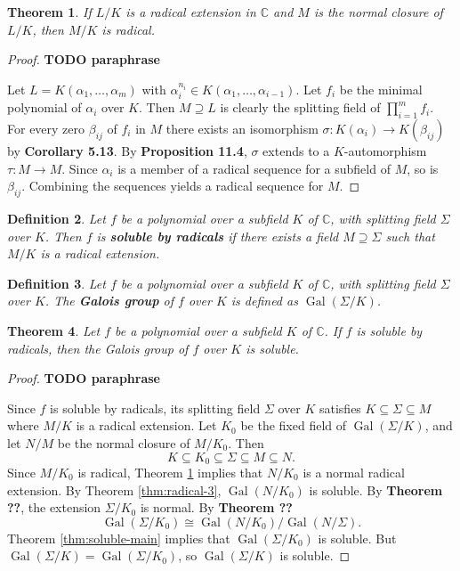 \documentclass[12pt]{article}
\newtheorem{theorem}{Theorem}
\newtheorem{definition}[theorem]{Definition}
\newcommand{\Gal}{\operatorname{Gal}}
\begin{document}
\begin{theorem} \label{thm:radical-closure}
    If $L / K$ is a radical extension in $\mathbb{C}$ and $M$ is the normal closure of $L / K$, then $M / K$ is radical.
\end{theorem}

\begin{proof}
\textbf{TODO paraphrase}

Let $L=K\left(\alpha_1, \ldots, \alpha_m\right)$ with $\alpha_i^{n_i} \in K\left(\alpha_1, \ldots, \alpha_{i-1}\right)$. Let $f_i$ be the minimal polynomial of $\alpha_i$ over $K$. Then $M \supseteq L$ is clearly the splitting field of $\prod_{i=1}^m f_i$. For every zero $\beta_{i j}$ of $f_i$ in $M$ there exists an isomorphism $\sigma : K\left(\alpha_i\right) \rightarrow K\left(\beta_{i j}\right)$ by \textbf{Corollary 5.13}. By \textbf{Proposition 11.4}, $\sigma$ extends to a $K$-automorphism $\tau: M \rightarrow M$. Since $\alpha_i$ is a member of a radical sequence for a subfield of $M$, so is $\beta_{i j}$. Combining the sequences yields a radical sequence for $M$.
\end{proof}


\begin{definition}
    Let $f$ be a polynomial over a subfield $K$ of $\mathbb{C}$, with splitting field $\Sigma$ over $K$. Then $f$ is \textbf{soluble by radicals} if there exists a field $M \supseteq \Sigma$ such that $M / K$ is a radical extension.  
\end{definition}


\begin{definition}
    Let $f$ be a polynomial over a subfield $K$ of $\mathbb{C}$, with splitting field $\Sigma$ over $K$. The \textbf{Galois group} of $f$ over $K$ is defined as $\Gal(\Sigma / K)$.
\end{definition}

\begin{theorem} \label{thm:radical-galois-soluble}
    Let $f$ be a polynomial over a subfield $K$ of $\mathbb{C}$. If $f$ is soluble by radicals, then the Galois group of $f$ over $K$ is soluble.
\end{theorem}

\begin{proof}
\textbf{TODO paraphrase}

Since $f$ is soluble by radicals, its splitting field $\Sigma$ over $K$ satisfies $K \subseteq \Sigma \subseteq M$ where $M / K$ is a radical extension. Let $K_0$ be the fixed field of $\Gal(\Sigma / K)$, and let $N / M$ be the normal closure of $M / K_0$. Then
$$
K \subseteq K_0 \subseteq \Sigma \subseteq M \subseteq N.
$$
Since $M / K_0$ is radical, Theorem \ref{thm:radical-closure} implies that $N / K_0$ is a normal radical extension. By Theorem \ref{thm:radical-3}, $\Gal\left(N / K_0\right)$ is soluble.
By \textbf{Theorem ??}, the extension $\Sigma / K_0$ is normal. By \textbf{Theorem ??}
$$
\Gal\left(\Sigma / K_0\right) \cong \Gal\left(N / K_0\right) / \Gal(N / \Sigma).
$$
Theorem \ref{thm:soluble-main} implies that $\Gal\left(\Sigma / K_0\right)$ is soluble. But $\Gal(\Sigma / K)=\Gal\left(\Sigma / K_0\right)$, so $\Gal(\Sigma / K)$ is soluble.

\end{proof}
\end{document}
